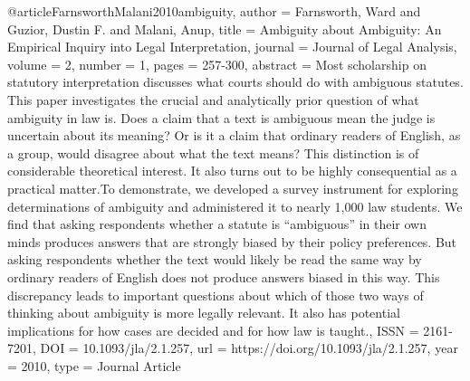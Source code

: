 

@article{FarnsworthMalani2010ambiguity,
   author = {Farnsworth, Ward and Guzior, Dustin F. and Malani, Anup},
   title = {Ambiguity about Ambiguity: An Empirical Inquiry into Legal Interpretation},
   journal = {Journal of Legal Analysis},
   volume = {2},
   number = {1},
   pages = {257-300},
   abstract = {Most scholarship on statutory interpretation discusses what courts should do with ambiguous statutes. This paper investigates the crucial and analytically prior question of what ambiguity in law is. Does a claim that a text is ambiguous mean the judge is uncertain about its meaning? Or is it a claim that ordinary readers of English, as a group, would disagree about what the text means? This distinction is of considerable theoretical interest. It also turns out to be highly consequential as a practical matter.To demonstrate, we developed a survey instrument for exploring determinations of ambiguity and administered it to nearly 1,000 law students. We find that asking respondents whether a statute is “ambiguous” in their own minds produces answers that are strongly biased by their policy preferences. But asking respondents whether the text would likely be read the same way by ordinary readers of English does not produce answers biased in this way. This discrepancy leads to important questions about which of those two ways of thinking about ambiguity is more legally relevant. It also has potential implications for how cases are decided and for how law is taught.},
   ISSN = {2161-7201},
   DOI = {10.1093/jla/2.1.257},
   url = {https://doi.org/10.1093/jla/2.1.257},
   year = {2010},
   type = {Journal Article}
}

